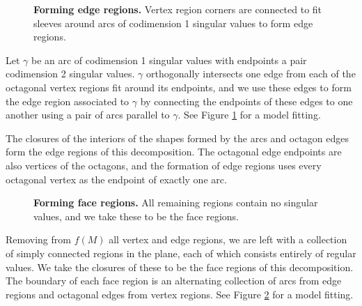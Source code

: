 \begin{figure}[h!]
	\caption{
		\textbf{Forming edge regions.}
		Vertex region corners are connected to fit sleeves around arcs of codimension 1 singular values to form edge regions.
	}
	\label{fig:edge-sleeve}
\end{figure}

Let $\gamma$ be an arc of codimension 1 singular values with endpoints a pair codimension 2 singular values.
$\gamma$ orthogonally intersects one edge from each of the octagonal vertex regions fit around its endpoints, and we use these edges to form the edge region associated to $\gamma$ by connecting the endpoints of these edges to one another using a pair of arcs parallel to $\gamma$.
See Figure \ref{fig:edge-sleeve} for a model fitting.

The closures of the interiors of the shapes formed by the arcs and octagon edges form the edge regions of this decomposition.
The octagonal edge endpoints are also vertices of the octagons, and the formation of edge regions uses every octagonal vertex as the endpoint of exactly one arc.

\begin{figure}[h!]
	\caption{
		\textbf{Forming face regions.}
		All remaining regions contain no singular values, and we take these to be the face regions.
	}
	\label{fig:face-sleeve}
\end{figure}

Removing from $f(M)$ all vertex and edge regions, we are left with a collection of simply connected regions in the plane, each of which consists entirely of regular values.
We take the closures of these to be the face regions of this decomposition.
The boundary of each face region is an alternating collection of arcs from edge regions and octagonal edges from vertex regions.
See Figure \ref{fig:face-sleeve} for a model fitting.
%
%
%
%

